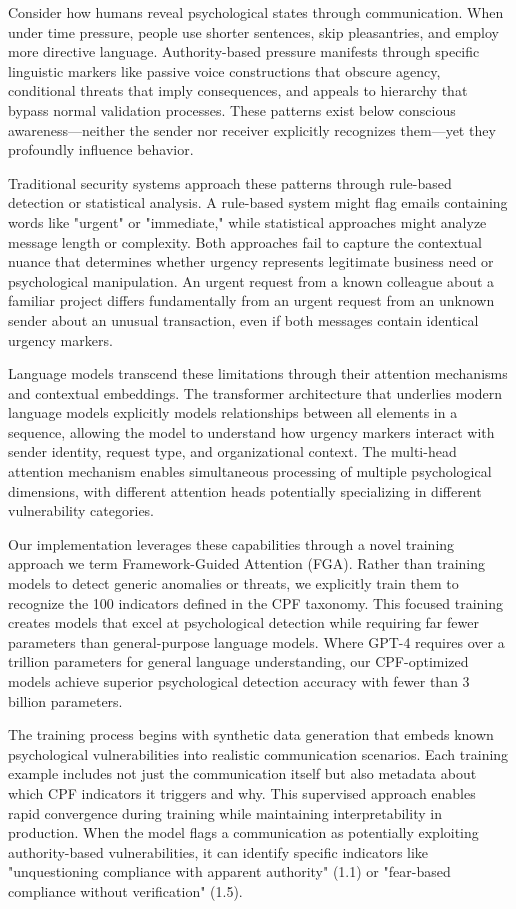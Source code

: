 \documentclass[11pt,a4paper]{article}
\begin{document}
Consider how humans reveal psychological states through communication. When under time pressure, people use shorter sentences, skip pleasantries, and employ more directive language. Authority-based pressure manifests through specific linguistic markers like passive voice constructions that obscure agency, conditional threats that imply consequences, and appeals to hierarchy that bypass normal validation processes. These patterns exist below conscious awareness—neither the sender nor receiver explicitly recognizes them—yet they profoundly influence behavior.

Traditional security systems approach these patterns through rule-based detection or statistical analysis. A rule-based system might flag emails containing words like "urgent" or "immediate," while statistical approaches might analyze message length or complexity. Both approaches fail to capture the contextual nuance that determines whether urgency represents legitimate business need or psychological manipulation. An urgent request from a known colleague about a familiar project differs fundamentally from an urgent request from an unknown sender about an unusual transaction, even if both messages contain identical urgency markers.

Language models transcend these limitations through their attention mechanisms and contextual embeddings. The transformer architecture that underlies modern language models explicitly models relationships between all elements in a sequence, allowing the model to understand how urgency markers interact with sender identity, request type, and organizational context. The multi-head attention mechanism enables simultaneous processing of multiple psychological dimensions, with different attention heads potentially specializing in different vulnerability categories.

Our implementation leverages these capabilities through a novel training approach we term Framework-Guided Attention (FGA). Rather than training models to detect generic anomalies or threats, we explicitly train them to recognize the 100 indicators defined in the CPF taxonomy. This focused training creates models that excel at psychological detection while requiring far fewer parameters than general-purpose language models. Where GPT-4 requires over a trillion parameters for general language understanding, our CPF-optimized models achieve superior psychological detection accuracy with fewer than 3 billion parameters.

The training process begins with synthetic data generation that embeds known psychological vulnerabilities into realistic communication scenarios. Each training example includes not just the communication itself but also metadata about which CPF indicators it triggers and why. This supervised approach enables rapid convergence during training while maintaining interpretability in production. When the model flags a communication as potentially exploiting authority-based vulnerabilities, it can identify specific indicators like "unquestioning compliance with apparent authority" (1.1) or "fear-based compliance without verification" (1.5).
\end{document}
